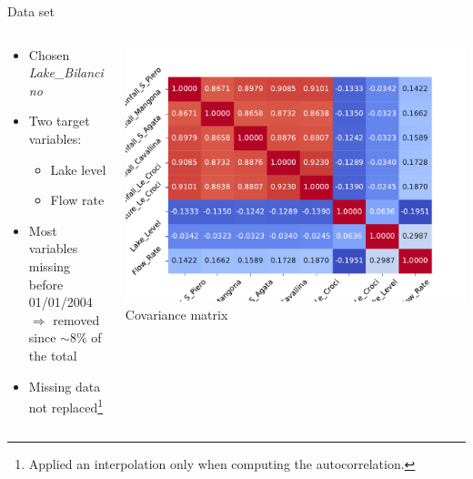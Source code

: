 \documentclass[aspectratio=169, glossy]{beamer}
\begin{document}
\begin{frame}{Data set}
  \begin{columns}
    \begin{column}{0.6\columnwidth}
      \begin{itemize}
        \item Chosen \textit{Lake\_Bilancino}
        \item Two target variables:
          \begin{itemize}
            \item Lake level
            \item Flow rate
          \end{itemize}
        \item Most variables missing before 01/01/2004\\
        $\Rightarrow$ removed since $\sim 8\%$ of the total
        \item Missing data not replaced\footnote{Applied an interpolation only when computing the autocorrelation.}
      \end{itemize}
      \vspace{7em}
    \end{column}
    \begin{column}{0.4\columnwidth}
      \begin{center}
        \includegraphics[width=0.8\columnwidth]{../plots/corr_vars.pdf}\\
        \tiny{Covariance matrix}
      \end{center}
    \end{column}
  \end{columns}
\end{frame}

\end{document}
